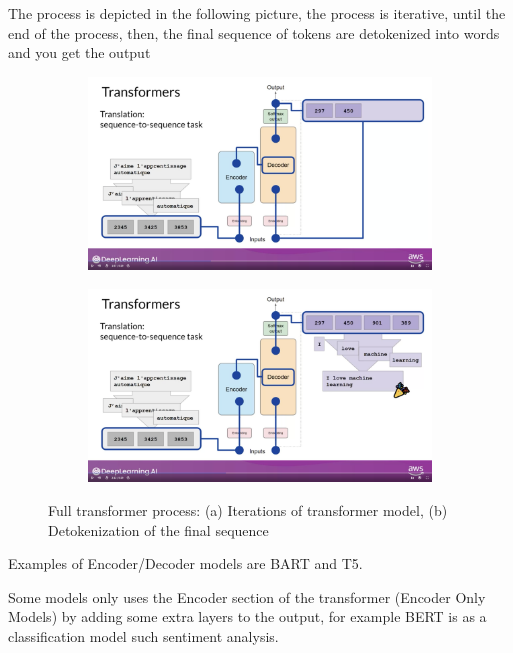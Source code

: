 \documentclass[12pt]{report}
\begin{document}
The process is depicted in the following picture, the process is iterative, until the end of the process, then, the final sequence of tokens are detokenized into words and you get the output


\begin{figure}
  \centering
  \begin{subfigure}[] %
    \centering
    \includegraphics[scale=0.08]{pics/fullTransformer.png}
  \end{subfigure}%
  \begin{subfigure}[] %
    \centering
    \includegraphics[scale=0.08]{pics/fullTransformer2.png}
  \end{subfigure}
  \caption{Full transformer process: (a) Iterations of transformer model, (b) Detokenization of the final sequence}
  \label{fig:test}
\end{figure}

Examples of Encoder/Decoder models are BART and T5.

Some models only uses the Encoder section of the transformer (Encoder Only Models) by adding some extra layers to the output, for example BERT is as a classification model such sentiment analysis.
\end{document}
